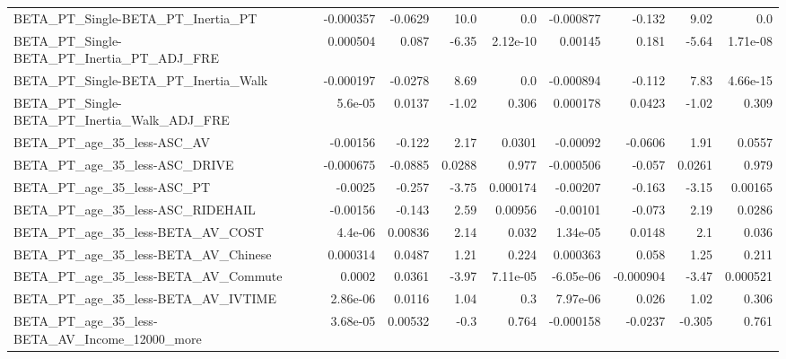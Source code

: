 \begin{tabular}{lrrrrrrrr}
BETA\_PT\_Single-BETA\_PT\_Inertia\_PT                  &   -0.000357 &      -0.0629 &     10.0 &      0.0 &  -0.000877 &      -0.132 &         9.02 &           0.0 \\
BETA\_PT\_Single-BETA\_PT\_Inertia\_PT\_ADJ\_FRE          &    0.000504 &        0.087 &    -6.35 & 2.12e-10 &    0.00145 &       0.181 &        -5.64 &      1.71e-08 \\
BETA\_PT\_Single-BETA\_PT\_Inertia\_Walk                &   -0.000197 &      -0.0278 &     8.69 &      0.0 &  -0.000894 &      -0.112 &         7.83 &      4.66e-15 \\
BETA\_PT\_Single-BETA\_PT\_Inertia\_Walk\_ADJ\_FRE        &     5.6e-05 &       0.0137 &    -1.02 &    0.306 &   0.000178 &      0.0423 &        -1.02 &         0.309 \\
BETA\_PT\_age\_35\_less-ASC\_AV                         &    -0.00156 &       -0.122 &     2.17 &   0.0301 &   -0.00092 &     -0.0606 &         1.91 &        0.0557 \\
BETA\_PT\_age\_35\_less-ASC\_DRIVE                      &   -0.000675 &      -0.0885 &   0.0288 &    0.977 &  -0.000506 &      -0.057 &       0.0261 &         0.979 \\
BETA\_PT\_age\_35\_less-ASC\_PT                         &     -0.0025 &       -0.257 &    -3.75 & 0.000174 &   -0.00207 &      -0.163 &        -3.15 &       0.00165 \\
BETA\_PT\_age\_35\_less-ASC\_RIDEHAIL                   &    -0.00156 &       -0.143 &     2.59 &  0.00956 &   -0.00101 &      -0.073 &         2.19 &        0.0286 \\
BETA\_PT\_age\_35\_less-BETA\_AV\_COST                   &     4.4e-06 &      0.00836 &     2.14 &    0.032 &   1.34e-05 &      0.0148 &          2.1 &         0.036 \\
BETA\_PT\_age\_35\_less-BETA\_AV\_Chinese                &    0.000314 &       0.0487 &     1.21 &    0.224 &   0.000363 &       0.058 &         1.25 &         0.211 \\
BETA\_PT\_age\_35\_less-BETA\_AV\_Commute                &      0.0002 &       0.0361 &    -3.97 & 7.11e-05 &  -6.05e-06 &   -0.000904 &        -3.47 &      0.000521 \\
BETA\_PT\_age\_35\_less-BETA\_AV\_IVTIME                 &    2.86e-06 &       0.0116 &     1.04 &      0.3 &   7.97e-06 &       0.026 &         1.02 &         0.306 \\
BETA\_PT\_age\_35\_less-BETA\_AV\_Income\_12000\_more      &    3.68e-05 &      0.00532 &     -0.3 &    0.764 &  -0.000158 &     -0.0237 &       -0.305 &         0.761 \\

\end{tabular}
